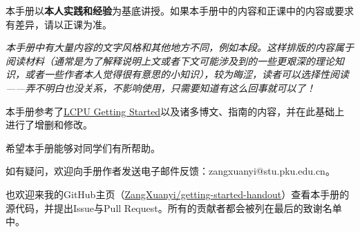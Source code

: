 \documentclass[../main.tex]{subfiles}
\begin{document}
本手册以\textbf{本人实践和经验}为基底讲授。如果本手册中的内容和正课中的内容或要求有差异，请以正课为准。

\emph{本手册中有大量内容的文字风格和其他地方不同，例如本段。这样排版的内容属于阅读材料（通常是为了解释说明上文或者下文可能涉及到的一些更艰深的理论知识，或者一些作者本人觉得很有意思的小知识），较为晦涩，读者可以选择性阅读——弄不明白也没关系，不影响使用，只需要知道有这么回事就可以了！}

本手册参考了\href{https://missing.lcpu.dev}{LCPU Getting Started}以及诸多博文、指南的内容，并在此基础上进行了增删和修改。

希望本手册能够对同学们有所帮助。

如有疑问，欢迎向手册作者发送电子邮件反馈：zangxuanyi@stu.pku.edu.cn。

也欢迎来我的GitHub主页（\faGithub\href{https://github.com/ZangXuanyi/getting-started-handout}{ZangXuanyi/getting-started-handout}）查看本手册的源代码，并提出Issue与Pull Request。所有的贡献者都会被列在最后的致谢名单中。
\end{document}
